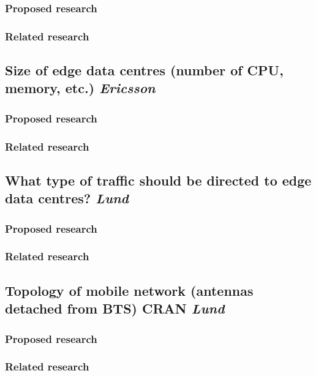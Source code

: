 \subsubsection{Proposed research}
\subsubsection{Related research}


\subsection{Size of edge data centres (number of CPU, memory, etc.) \emph{Ericsson}}
\subsubsection{Proposed research}
\subsubsection{Related research}


\subsection{What type of traffic should be directed to edge data centres? \emph{Lund}}
\subsubsection{Proposed research}
\subsubsection{Related research}


\subsection{Topology of mobile network (antennas detached from BTS) CRAN \emph{Lund}}
\subsubsection{Proposed research}
\subsubsection{Related research}